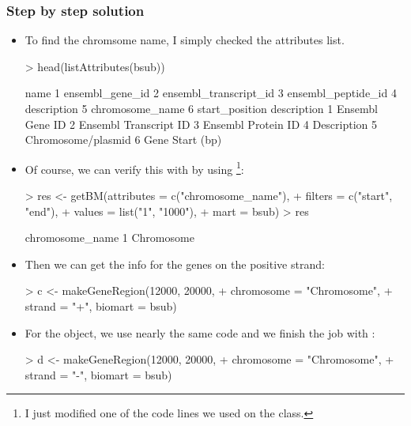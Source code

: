 \begin{frame}
  \frametitle{Step by step solution}
  \begin{itemize}
  \item To find the chromsome name, I simply checked the attributes list. \scriptsize
\begin{Schunk}
\begin{Sinput}
> head(listAttributes(bsub))
\end{Sinput}
\begin{Soutput}
                   name
1       ensembl_gene_id
2 ensembl_transcript_id
3    ensembl_peptide_id
4           description
5       chromosome_name
6        start_position
            description
1       Ensembl Gene ID
2 Ensembl Transcript ID
3    Ensembl Protein ID
4           Description
5    Chromosome/plasmid
6       Gene Start (bp)
\end{Soutput}
\end{Schunk}
\normalsize
  \item Of course, we can verify this with by using \footnote{I just modified one of the code lines we used on the  class.}:
\begin{Schunk}
\begin{Sinput}
> res <- getBM(attributes = c("chromosome_name"), 
+     filters = c("start", "end"), 
+     values = list("1", "1000"), 
+     mart = bsub)
> res
\end{Sinput}
\begin{Soutput}
  chromosome_name
1      Chromosome
\end{Soutput}
\end{Schunk}
  \item Then we can get the info for the genes on the positive strand:
\begin{Schunk}
\begin{Sinput}
> c <- makeGeneRegion(12000, 20000, 
+     chromosome = "Chromosome", 
+     strand = "+", biomart = bsub)
\end{Sinput}
\end{Schunk}
  \item For the  object, we use nearly the same code and we finish the job with :
\begin{Schunk}
\begin{Sinput}
> d <- makeGeneRegion(12000, 20000, 
+     chromosome = "Chromosome", 
+     strand = "-", biomart = bsub)
\end{Sinput}
\end{Schunk}
  \end{itemize}
\end{frame}

